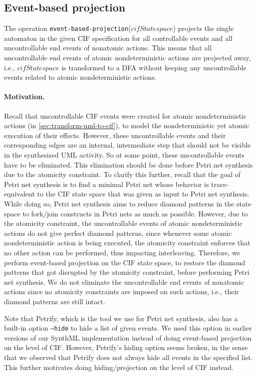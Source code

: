 \documentclass{article}
\newcommand{\keyw}[1]{\texttt{#1}}
\newcommand{\var}[1]{\ensuremath{\mathit{#1}}}
\newcommand{\eventBasedProjectionLabel}[0]{\keyw{event-based-projection}}
\newcommand{\eventBasedProjection}[1]{\eventBasedProjectionLabel(\ensuremath{#1})}
\theoremstyle{definition}
\begin{document}
\subsection{Event-based projection}
\label{sec:event-based-projection}

The operation \eventBasedProjection{\var{cifStatespace}} projects the single automaton in the given CIF specification for all controllable events and all uncontrollable end events of nonatomic actions.
This means that all uncontrollable end events of atomic nondeterministic actions are projected away, i.e., \var{cifStatespace} is transformed to a DFA without keeping any uncontrollable events related to atomic nondeterministic actions.

\paragraph{Motivation.}
Recall that uncontrollable CIF events were created for atomic nondeterministic actions (in \autoref{sec:transform-uml-to-cif}), to model the nondeterministic yet atomic execution of their effects.
However, these uncontrollable events and their corresponding edges are an internal, intermediate step that should not be visible in the synthesized UML activity.
So at some point, these uncontrollable events have to be eliminated.
This elimination should be done before Petri net synthesis due to the atomicity constraint.
To clarify this further, recall that the goal of Petri net synthesis is to find a minimal Petri net whose behavior is trace-equivalent to the CIF state space that was given as input to Petri net synthesis.
While doing so, Petri net synthesis aims to reduce diamond patterns in the state space to fork/join constructs in Petri nets as much as possible.
However, due to the atomicity constraint, the uncontrollable events of atomic nondeterministic actions do not give perfect diamond patterns, since whenever some atomic nondeterministic action is being executed, the atomicity constraint enforces that no other action can be performed, thus impacting interleaving.
Therefore, we perform event-based projection on the CIF state space, to restore the diamond patterns that got disrupted by the atomicity constraint, before performing Petri net synthesis.
We do not eliminate the uncontrollable end events of nonatomic actions since no atomicity constraints are imposed on such actions, i.e., their diamond patterns are still intact.

Note that Petrify, which is the tool we use for Petri net synthesis, also has a built-in option \texttt{--hide} to hide a list of given events.
We used this option in earlier versions of our SynthML implementation instead of doing event-based projection on the level of CIF.
However, Petrify's hiding option seems broken, in the sense that we observed that Petrify does not always hide all events in the specified list.
This further motivates doing hiding/projection on the level of CIF instead.
\end{document}
